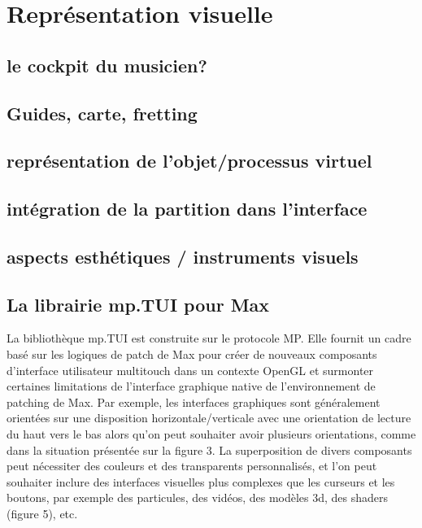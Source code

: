 %
\chapter{Représentation visuelle}
\label{ch:visual_representation}



\section{le cockpit du musicien?}
\label{sec:visual_representation:sec1}

\section{Guides, carte, fretting}

\section{représentation de l'objet/processus virtuel}

\section{intégration de la partition dans l'interface}

\section{aspects esthétiques / instruments visuels}

\section{La librairie mp.TUI pour Max}

La bibliothèque mp.TUI est construite sur le protocole MP. Elle fournit un cadre basé sur les logiques de patch de Max pour créer de nouveaux composants d'interface utilisateur multitouch dans un contexte OpenGL et surmonter certaines limitations de l'interface graphique native de l'environnement de patching de Max. Par exemple, les interfaces graphiques sont généralement orientées sur une disposition horizontale/verticale avec une orientation de lecture du haut vers le bas alors qu'on peut souhaiter avoir plusieurs orientations, comme dans la situation présentée sur la figure 3. La superposition de divers composants peut nécessiter des couleurs et des transparents personnalisés, et l'on peut souhaiter inclure des interfaces visuelles plus complexes que les curseurs et les boutons, par exemple des particules, des vidéos, des modèles 3d, des shaders (figure 5), etc.

